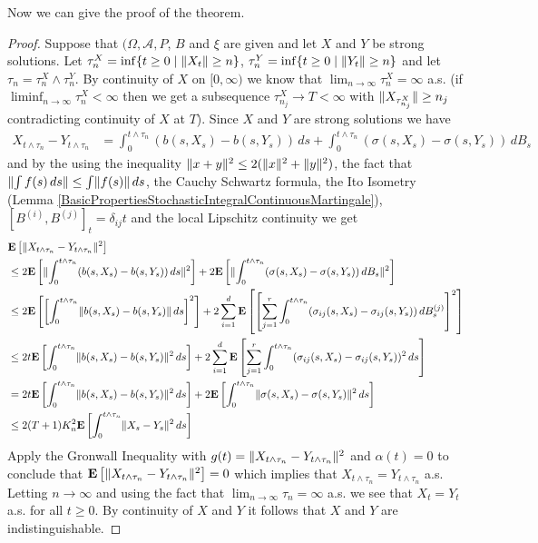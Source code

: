 Now we can give the proof of the theorem.
\begin{proof}
Suppose that $(\Omega, \mathcal{A}, P$, $B$ and $\xi$ are given and let $X$ and $Y$ be strong solutions.  Let $\tau^X_n = \inf \lbrace t \geq 0 \mid \lVert X_t \rVert \geq n \rbrace$,
$\tau^Y_n = \inf \lbrace t \geq 0 \mid \lVert Y_t \rVert \geq n \rbrace$ and let $\tau_n = \tau^X_n \wedge \tau^Y_n$.  By continuity of $X$ on $[0,\infty)$ we know that $\lim_{n \to \infty} \tau^X_n = \infty$ a.s. (if $\liminf_{n \to \infty} \tau^X_n < \infty$ then we get a subsequence $\tau^X_{n_j} \to T < \infty$ with $\lVert X_{\tau^X_{n_j}} \rVert \geq n_j$ contradicting continuity of $X$ at $T$).  Since $X$ and $Y$ are strong solutions we have
\begin{align*}
X_{t \wedge \tau_n} - Y_{t \wedge \tau_n} &= \int_0^{t \wedge \tau_n} (b(s,X_s) - b(s,Y_s)) \, ds + \int_0^{t \wedge \tau_n} (\sigma(s,X_s) - \sigma(s,Y_s)) \, dB_s
\end{align*}
and by the using the inequality $\lVert x + y \rVert^2 \leq 2(\lVert x \rVert^2 + \lVert y \rVert^2)$, the fact that $\lVert \int f(s) \, ds \rVert \leq \int \lVert f(s) \rVert \, ds$, the Cauchy Schwartz formula, the Ito Isometry (Lemma \ref{BasicPropertiesStochasticIntegralContinuousMartingale}), $[B^{(i)}, B^{(j)}]_t = \delta_{ij} t$ and the local Lipschitz continuity we get
\begin{align*}
&\textbf{E}\left[\lVert X_{t \wedge \tau_n} - Y_{t \wedge \tau_n} \rVert^2\right]  \\
&\leq 2\textbf{E}\left[\lVert \int_0^{t \wedge \tau_n} (b(s,X_s) - b(s,Y_s)) \, ds \rVert^2\right] 
+2 \textbf{E}\left[\lVert  \int_0^{t \wedge \tau_n} (\sigma(s,X_s) - \sigma(s,Y_s)) \, dB_s  \rVert^2\right] \\
&\leq
2\textbf{E}\left[\left [ \int_0^{t \wedge \tau_n} \lVert b(s,X_s) - b(s,Y_s) \rVert \, ds \right ]^2\right] 
+2 \sum_{i=1}^d \textbf{E}\left[\left [\sum_{j=1}^r \int_0^{t \wedge \tau_n} (\sigma_{ij}(s,X_s) - \sigma_{ij}(s,Y_s)) \, dB^{(j)}_s \right]^2 \right] \\
&\leq
2t \textbf{E}\left[\int_0^{t \wedge \tau_n} \lVert b(s,X_s) - b(s,Y_s) \rVert^2 \, ds \right] 
+2 \sum_{i=1}^d \textbf{E}\left[ \sum_{j=1}^r \int_0^{t \wedge \tau_n} (\sigma_{ij}(s,X_s) - \sigma_{ij}(s,Y_s))^2 \, ds \right] \\
&=
2t \textbf{E}\left[\int_0^{t \wedge \tau_n} \lVert b(s,X_s) - b(s,Y_s) \rVert^2 \, ds \right] 
+2 \textbf{E}\left[ \int_0^{t \wedge \tau_n} \lVert \sigma(s,X_s) - \sigma(s,Y_s) \rVert^2 \, ds \right] \\
&\leq 2(T+1)K_n^2 \textbf{E}\left[\int_0^{t \wedge \tau_n} \lVert X_s -Y_s \rVert^2 \, ds \right]
\end{align*}
Apply the Gronwall Inequality with $g(t) = \lVert X_{t \wedge \tau_n} - Y_{t \wedge \tau_n} \rVert^2$ and $\alpha(t) = 0$ to conclude that 
$\textbf{E}\left[\lVert X_{t \wedge \tau_n} - Y_{t \wedge \tau_n} \rVert^2\right] = 0$ which implies that $X_{t \wedge \tau_n} = Y_{t \wedge \tau_n}$ a.s.  Letting $n \to \infty$ and
using the fact that $\lim_{n \to \infty} \tau_n = \infty$ a.s. we see that $X_{t} = Y_{t}$ a.s. for all $t \geq 0$.  By continuity of $X$ and $Y$ it follows that $X$
and $Y$ are indistinguishable.
\end{proof}

